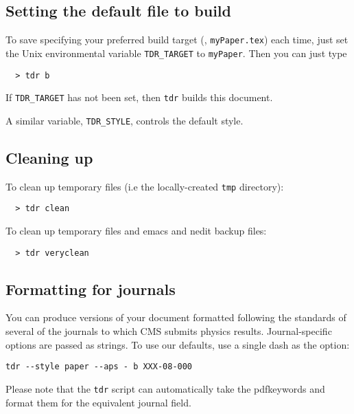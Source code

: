 \subsection{Setting the default file to build}
%
To save specifying your preferred build target (\eg, \texttt{myPaper.tex}) each
time, just set the Unix environmental variable \texttt{TDR\_TARGET}
to \texttt{myPaper}.
Then you can just type
%
\vspace*{-2.5ex}\begin{verbatim}
  > tdr b
\end{verbatim}
%
If \texttt{TDR\_TARGET} has not been set, then \texttt{tdr} builds this document.

A similar variable, \texttt{TDR\_STYLE}, controls the default style.
\subsection{Cleaning up}

To clean up temporary files (i.e the locally-created \texttt{tmp} directory):
\vspace*{-2.5ex}\begin{verbatim}
  > tdr clean
\end{verbatim}
%
To clean up temporary files and emacs and nedit backup files:
\vspace*{-2.5ex}\begin{verbatim}
  > tdr veryclean
\end{verbatim}



\subsection{Formatting for journals\label{sec:journal-formatting}}
You can produce versions of your document formatted following the standards of several of the journals to which CMS submits physics results. Journal-specific options are passed as strings. To use
our defaults, use a single dash as the option:


\begin{verbatim}
tdr --style paper --aps - b XXX-08-000
\end{verbatim}

Please note that the \texttt{tdr} script can automatically take the pdfkeywords and format them for the equivalent journal field.

